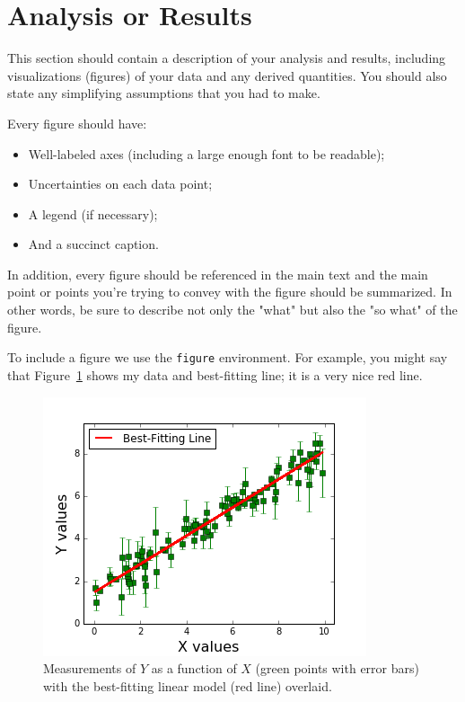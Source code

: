 \documentclass{revtex4}
\begin{document}
\section{Analysis or Results}\label{sec:analysis}

This section should contain a description of your analysis and results, including visualizations (figures) of your data and any derived quantities. You should also state any simplifying assumptions that you had to make.  

Every figure should have:
\begin{itemize}
\item{Well-labeled axes (including a large enough font to be readable);}
\item{Uncertainties on each data point;}
\item{A legend (if necessary);}
\item{And a succinct caption.}
\end{itemize}

In addition, every figure should be referenced in the main text and the main point or points you're trying to convey with the figure should be summarized.  In other words, be sure to describe not only the "what" but also the "so what" of the figure. 

To include a figure we use the {\tt figure} environment. For example, you might say that Figure~\ref{fig:example} shows my data and best-fitting line; it is a very nice
red line.
\begin{figure}[!h] %
\includegraphics[height=3in]{example-figure.png}
\caption{Measurements of $Y$ as a function of $X$ (green points with error bars) with the best-fitting linear model (red line) overlaid. \label{fig:example}}
\end{figure}
\end{document}
